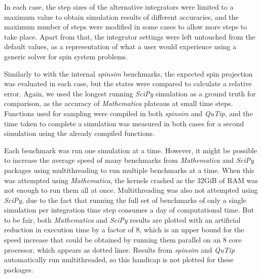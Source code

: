 \documentclass{jors}
\begin{document}
		In each case, the step sizes of the alternative integrators were limited to a maximum value to obtain simulation results of different accuracies, and the maximum number of steps were modified in some cases to allow more steps to take place.
		Apart from that, the integrator settings were left untouched from the default values, as a representation of what a user would experience using a generic solver for spin system problems.

		Similarly to with the internal \emph{spinsim} benchmarks, the expected spin projection was evaluated in each case, but the states were compared to calculate a relative error.
		Again, we used the longest running \emph{SciPy} simulation as a ground truth for comparison, as the accuracy of \emph{Mathematica} plateaus at small time steps.
		Functions used for sampling were compiled in both \emph{spinsim} and \emph{QuTip}, and the time taken to complete a simulation was measured in both cases for a second simulation using the already compiled functions.

		Each benchmark was run one simulation at a time.
		However, it might be possible to increase the average speed of many benchmarks from \emph{Mathematica} and \emph{SciPy} packages using multithreading to run multiple benchmarks at a time.
		When this was attempted using \emph{Mathematica}, the kernels crashed as the 32GiB of RAM was not enough to run them all at once.
		Multithreading was also not attempted using \emph{SciPy}, due to the fact that running the full set of benchmarks of only a single simulation per integration time step consumes a day of computational time.
		But to be fair, both \emph{Mathematica} and \emph{SciPy} results are plotted with an artificial reduction in execution time by a factor of 8, which is an upper bound for the speed increase that could be obtained by running them parallel on an 8 core processor, which appears as dotted lines.
		Results from \emph{spinsim} and \emph{QuTip} automatically run multithreaded, so this handicap is not plotted for these packages.
\end{document}
